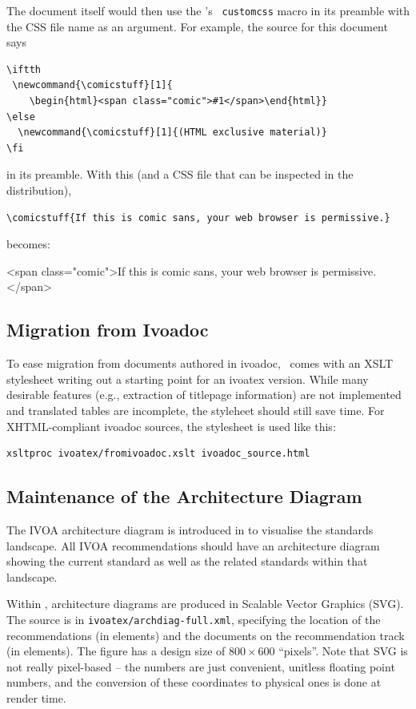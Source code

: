 \documentclass[11pt,a4paper]{ivoa}
\newcommand{\texword}[1]{\texttt{\color{texcolor} #1}}
\newcommand{\comicstuff}[1]{
    \begin{html}<span class="comic">#1</span>\end{html}}
\newcommand{\comicstuff}[1]{(HTML exclusive material)}
\begin{document}
The document itself would then use the \ivoatex's \texword{customcss}
macro in its preamble with the CSS file name as an argument.  For
example, the source for this document says

\begin{lstlisting}
\iftth
 \newcommand{\comicstuff}[1]{
    \begin{html}<span class="comic">#1</span>\end{html}}
\else
  \newcommand{\comicstuff}[1]{(HTML exclusive material)}
\fi
\end{lstlisting}

\noindent in its preamble.  With this (and a CSS file that can be inspected in the
distribution),

\begin{lstlisting}
\comicstuff{If this is comic sans, your web browser is permissive.}
\end{lstlisting}

\noindent becomes: 
\comicstuff{If this is comic sans, your web browser is permissive.}

\subsection{Migration from Ivoadoc}

To ease migration from documents authored in ivoadoc, \ivoatex\ comes
with an XSLT stylesheet writing out a starting point for an ivoatex
version.  While many desirable features (e.g., extraction of titlepage
information) are not implemented and translated tables are incomplete,
the styleheet should still save time.  For XHTML-compliant ivoadoc
sources, the stylesheet is used like this:

\begin{lstlisting}[language=sh]
xsltproc ivoatex/fromivoadoc.xslt ivoadoc_source.html
\end{lstlisting}

\subsection{Maintenance of the Architecture Diagram}

The IVOA architecture diagram is introduced in
\citet{2010ivoa.rept.1123A} to
visualise the standards landscape.  All IVOA recommendations should have
an architecture diagram showing the current standard as well as the
related standards within that landscape.

Within \ivoatex, architecture diagrams are produced in Scalable Vector
Graphics (SVG).  The source is in \texttt{ivoatex/archdiag-full.xml},
specifying the location of the recommendations (in  elements)
and the documents on the recommendation track (in 
elements).  The figure has a design size of $800\times 600$ ``pixels''.
Note that SVG is not really pixel-based -- the numbers are just
convenient, unitless floating point numbers, and the conversion of these
coordinates to physical ones is done at render time.
\end{document}

